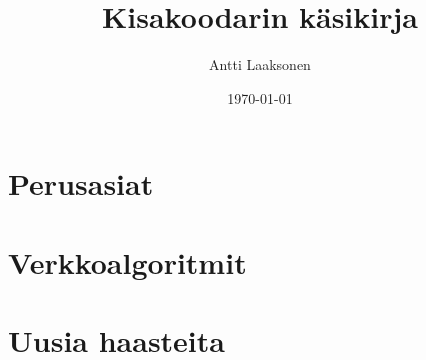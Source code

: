 \documentclass[twoside,12pt,a4paper,finnish]{book}
\date{\Large \today}
\title{\Huge Kisakoodarin käsikirja}
\author{\Large Antti Laaksonen}
\begin{document}


\frontmatter
\maketitle
\setcounter{tocdepth}{1}
\tableofcontents



\mainmatter
{}
\setcounter{page}{1}



\newcommand\setrow[5]{
  \setcounter{col}{1}
  \foreach \n in {#1, #2, #3, #4, #5} {
    \edef\x{\value{col} - 0.5}
    \edef\y{9.5 - \value{row}}
    \node[anchor=center] at (\x, \y) {\n};
    \stepcounter{col}
  }
  \stepcounter{row}
}

\newenvironment{task}[0]
{
\begin{framed}
\noindent
\textit{Tehtävä:}
}
{\end{framed}}

\part{Perusasiat}










\part{Verkkoalgoritmit}










\part{Uusia haasteita}











\printindex
\end{document}
